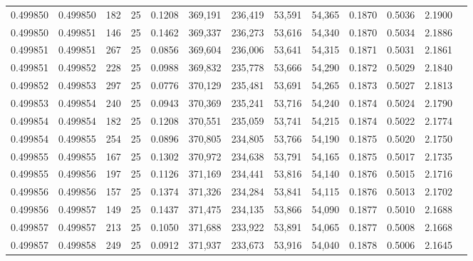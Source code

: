 \begin{tabular}{rrrrrrrrrrrrr}
0.499850 & 0.499850 & 182 &  25 &                                     0.1208 & 369,191 & 236,419 &  53,591 &  54,365 & 0.1870 & 0.5036 & 2.1900 \\
0.499850 & 0.499851 & 146 &  25 &                                     0.1462 & 369,337 & 236,273 &  53,616 &  54,340 & 0.1870 & 0.5034 & 2.1886 \\
0.499851 & 0.499851 & 267 &  25 &                                     0.0856 & 369,604 & 236,006 &  53,641 &  54,315 & 0.1871 & 0.5031 & 2.1861 \\
0.499851 & 0.499852 & 228 &  25 &                                     0.0988 & 369,832 & 235,778 &  53,666 &  54,290 & 0.1872 & 0.5029 & 2.1840 \\
0.499852 & 0.499853 & 297 &  25 &                                     0.0776 & 370,129 & 235,481 &  53,691 &  54,265 & 0.1873 & 0.5027 & 2.1813 \\
0.499853 & 0.499854 & 240 &  25 &                                     0.0943 & 370,369 & 235,241 &  53,716 &  54,240 & 0.1874 & 0.5024 & 2.1790 \\
0.499854 & 0.499854 & 182 &  25 &                                     0.1208 & 370,551 & 235,059 &  53,741 &  54,215 & 0.1874 & 0.5022 & 2.1774 \\
0.499854 & 0.499855 & 254 &  25 &                                     0.0896 & 370,805 & 234,805 &  53,766 &  54,190 & 0.1875 & 0.5020 & 2.1750 \\
0.499855 & 0.499855 & 167 &  25 &                                     0.1302 & 370,972 & 234,638 &  53,791 &  54,165 & 0.1875 & 0.5017 & 2.1735 \\
0.499855 & 0.499856 & 197 &  25 &                                     0.1126 & 371,169 & 234,441 &  53,816 &  54,140 & 0.1876 & 0.5015 & 2.1716 \\
0.499856 & 0.499856 & 157 &  25 &                                     0.1374 & 371,326 & 234,284 &  53,841 &  54,115 & 0.1876 & 0.5013 & 2.1702 \\
0.499856 & 0.499857 & 149 &  25 &                                     0.1437 & 371,475 & 234,135 &  53,866 &  54,090 & 0.1877 & 0.5010 & 2.1688 \\
0.499857 & 0.499857 & 213 &  25 &                                     0.1050 & 371,688 & 233,922 &  53,891 &  54,065 & 0.1877 & 0.5008 & 2.1668 \\
0.499857 & 0.499858 & 249 &  25 &                                     0.0912 & 371,937 & 233,673 &  53,916 &  54,040 & 0.1878 & 0.5006 & 2.1645 \\

\end{tabular}
